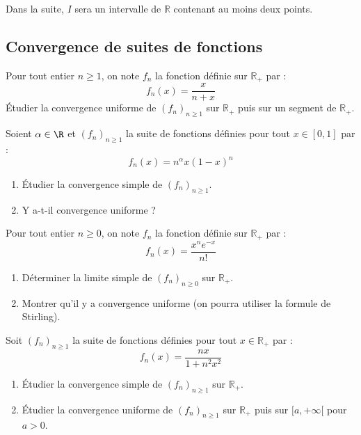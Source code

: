 \documentclass[a4paper,twoside,french,11pt]{VcCours}
\begin{document}

\tableofcontents
\separationTitre

Dans la suite, $I$ sera un intervalle de $\mathbb{R}$ contenant au moins deux points.

\subsection{\large Convergence de suites de fonctions}


\begin{Exercice}{} Pour tout entier $n \geq 1$, on note $f_n$ la fonction définie sur $\mathbb{R}_+$ par :
$$ f_n(x) = \frac{x}{n+x}$$
Étudier la convergence uniforme de $(f_n)_{n \geq 1}$ sur $\mathbb{R}_+$ puis sur un segment de $\mathbb{R}_+$.
\end{Exercice}


\begin{Exercice}{} Soient $\alpha \in \R$ et $(f_n)_{n \geq 1}$ la suite de fonctions définies pour tout $x \in [0,1]$ par :
$$f_n(x) = n^\alpha x(1-x)^n$$

\begin{enumerate}
 \item Étudier la convergence simple de $(f_n)_{n \geq 1}$.
 \item Y a-t-il convergence uniforme ?
  \end{enumerate}
\end{Exercice}


\begin{Exercice}{} Pour tout entier $n \geq 0$, on note $f_n$ la fonction définie sur $\mathbb{R}_+$ par :
$$ f_n(x) = \frac{x^n e^{-x}}{n!}$$

\begin{enumerate}
\item Déterminer la limite simple de $(f_n)_{n \geq 0}$ sur $\mathbb{R}_+$.
\item Montrer qu'il y a convergence uniforme (on pourra utiliser la formule de Stirling).
\end{enumerate}
\end{Exercice} 


\begin{Exercice}{} Soit $(f_n)_{n \geq 1}$ la suite de fonctions définies pour tout $x \in \mathbb{R}_+$ par :
$$f_n(x) = \frac {nx}{1+n^2x^2}$$
\begin{enumerate}
\item Étudier la convergence simple de $(f_n)_{n \geq 1}$ sur $\mathbb{R}_+$.
\item Étudier la convergence uniforme de $(f_n)_{n \geq 1}$ sur $\mathbb{R}_+$ puis sur $[a, + \infty[$ pour $a>0$.
\end{enumerate}
\end{Exercice}
\end{document}
